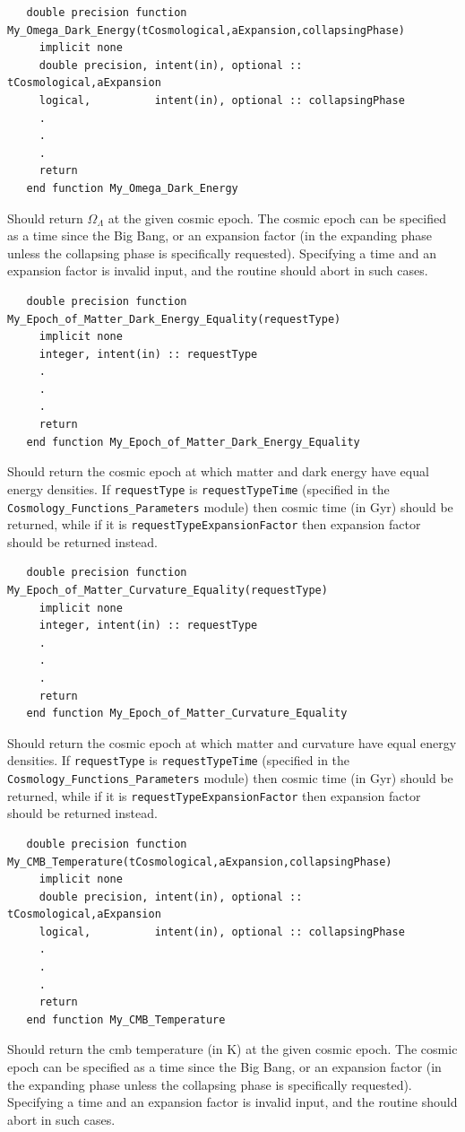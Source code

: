 \begin{verbatim}
   double precision function My_Omega_Dark_Energy(tCosmological,aExpansion,collapsingPhase)
     implicit none
     double precision, intent(in), optional :: tCosmological,aExpansion
     logical,          intent(in), optional :: collapsingPhase
     .
     .
     .
     return
   end function My_Omega_Dark_Energy
\end{verbatim}
Should return $\Omega_\Lambda$ at the given cosmic epoch. The cosmic epoch can be specified as a time since the Big Bang, or an expansion factor (in the expanding phase unless the collapsing phase is specifically requested). Specifying a time and an expansion factor is invalid input, and the routine should abort in such cases.

\begin{verbatim}
   double precision function My_Epoch_of_Matter_Dark_Energy_Equality(requestType)
     implicit none
     integer, intent(in) :: requestType
     .
     .
     .
     return
   end function My_Epoch_of_Matter_Dark_Energy_Equality
\end{verbatim}
Should return the cosmic epoch at which matter and dark energy have equal energy densities. If {\tt requestType} is {\tt requestTypeTime} (specified in the {\tt Cosmology\_Functions\_Parameters} module) then cosmic time (in Gyr) should be returned, while if it is {\tt requestTypeExpansionFactor} then expansion factor should be returned instead.

\begin{verbatim}
   double precision function My_Epoch_of_Matter_Curvature_Equality(requestType)
     implicit none
     integer, intent(in) :: requestType
     .
     .
     .
     return
   end function My_Epoch_of_Matter_Curvature_Equality
\end{verbatim}
Should return the cosmic epoch at which matter and curvature have equal energy densities. If {\tt requestType} is {\tt requestTypeTime} (specified in the {\tt Cosmology\_Functions\_Parameters} module) then cosmic time (in Gyr) should be returned, while if it is {\tt requestTypeExpansionFactor} then expansion factor should be returned instead.

\begin{verbatim}
   double precision function My_CMB_Temperature(tCosmological,aExpansion,collapsingPhase)
     implicit none
     double precision, intent(in), optional :: tCosmological,aExpansion
     logical,          intent(in), optional :: collapsingPhase
     .
     .
     .
     return
   end function My_CMB_Temperature
\end{verbatim}
Should return the \gls{cmb} temperature (in K) at the given cosmic epoch. The cosmic epoch can be specified as a time since the Big Bang, or an expansion factor (in the expanding phase unless the collapsing phase is specifically requested). Specifying a time and an expansion factor is invalid input, and the routine should abort in such cases.

